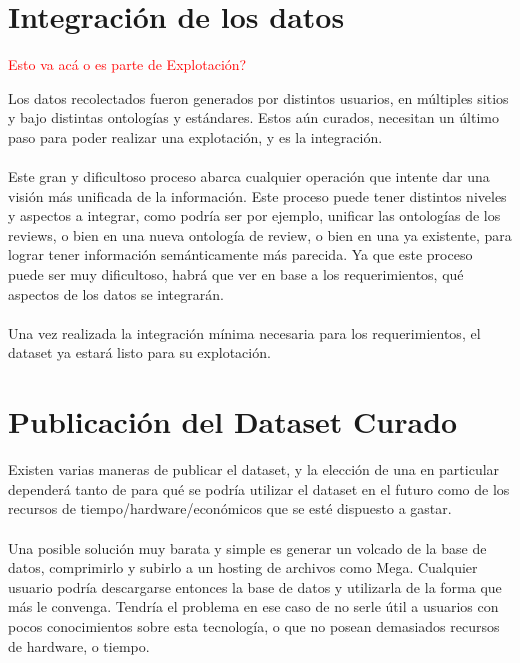 %

\section{Integración de los datos}
\label{section:integracion}
\begin{framed}
\textcolor{red}{Esto va acá o es parte de Explotación?}
\end{framed}

Los datos recolectados fueron generados por distintos usuarios, en múltiples sitios y bajo distintas ontologías y estándares.
Estos aún curados, necesitan un último paso para poder realizar una explotación, y es la integración.
\\\\
Este gran y dificultoso proceso abarca cualquier operación que intente dar una visión más unificada de la información. Este
proceso puede tener distintos niveles y aspectos a integrar, como podría ser por ejemplo, unificar las ontologías de los reviews, o bien
en una nueva ontología de review, o bien en una ya existente, para lograr tener información semánticamente más parecida. Ya 
que este proceso puede ser muy dificultoso, habrá que ver en base a los requerimientos, qué aspectos de los datos se integrarán.
\\\\
Una vez realizada la integración mínima necesaria para los requerimientos, el dataset ya estará listo para su explotación.

\section{Publicación del Dataset Curado}

Existen varias maneras de publicar el dataset, y la elección de una en particular dependerá tanto de para qué se podría utilizar el dataset en el futuro como
de los recursos de tiempo/hardware/económicos que se esté dispuesto a gastar.
\\\\
Una posible solución muy barata y simple es generar un volcado de la base de datos, comprimirlo y subirlo a un hosting de archivos como Mega. Cualquier usuario podría descargarse entonces la base de datos y utilizarla de la forma que más le convenga.
Tendría el problema en ese caso de no serle útil a usuarios con pocos conocimientos sobre esta tecnología, o que no posean demasiados recursos de hardware, o tiempo.


